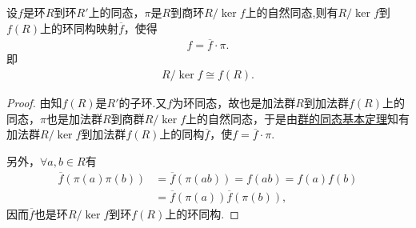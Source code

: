 \documentclass[../../main.tex]{subfiles}%
\begin{document}
\begin{theorem}[环的同态基本定理]\label{theorem:环的同态基本定理}
设$f$是环$R$到环$R'$上的同态，$\pi$是$R$到商环$R/\ker f$上的自然同态,则有$R/\ker f$到$f(R)$上的环同构映射$\overline{f}$，使得
\begin{align}
f = \overline{f} \cdot \pi. \label{eq:1ger4wg34wgg54.7.g890u34349n8v4b6}
\end{align}
即
\begin{align*}
R/\ker f \cong f(R).
\end{align*}
\end{theorem}
\begin{proof}

由知$f(R)$是$R'$的子环.又$f$为环同态，故也是加法群$R$到加法群$f(R)$上的同态，$\pi$也是加法群$R$到商群$R/\ker f$上的自然同态，于是由\hyperref[theorem:群的同态基本定理]{群的同态基本定理}知有加法群$R/\ker f$到加法群$f(R)$上的同构$\overline{f}$，使$f = \overline{f} \cdot \pi$.

另外，$\forall a,b \in R$有
\begin{align*}
\overline{f}(\pi(a)\pi(b)) &= \overline{f}(\pi(ab)) = f(ab) = f(a)f(b) \\
&= \overline{f}(\pi(a))\overline{f}(\pi(b)),
\end{align*}
因而$\overline{f}$也是环$R/\ker f$到环$f(R)$上的环同构.


\end{proof}
\end{document}
